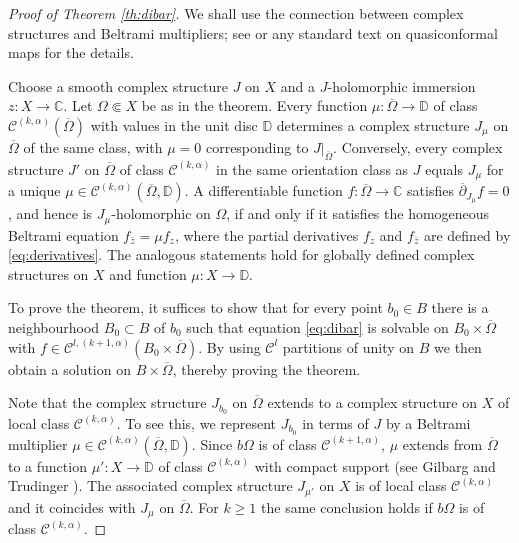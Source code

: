 \documentclass[11pt]{amsart}
\numberwithin{equation}{section}
\theoremstyle{definition}
\newcommand\Cscr{\mathscr{C}}
\newcommand\C{\mathbb{C}}
\newcommand\D{\overline{\mathbb D}}
\renewcommand\D{\mathbb D}
\newcommand\dibar{\overline\partial}
\begin{document}
\begin{proof}[Proof of Theorem \ref{th:dibar}]
We shall use the connection between complex
structures and Beltrami multipliers; see 
\cite[Sect.\ 2]{Forstneric2024Runge} or any 
standard text on quasiconformal maps for the details.

Choose a smooth complex structure $J$ on $X$ and 
a $J$-holomorphic immersion $z:X\to\C$.
Let $\Omega\Subset X$ be as in the theorem. 
Every function $\mu:\overline \Omega\to\D$ 
of class $\Cscr^{(k,\alpha)}(\overline \Omega)$  with values
in the unit disc $\D$ 
determines a complex structure $J_\mu$ on $\overline\Omega$ 
of the same class, with $\mu=0$ corresponding to $J|_{\overline\Omega}$. 
Conversely, every complex structure $J'$ on $\overline \Omega$
of class $\Cscr^{(k,\alpha)}$ in the same orientation class 
as $J$ equals $J_\mu$ for a unique 
$\mu\in \Cscr^{(k,\alpha)}(\overline \Omega,\D)$. 
A differentiable function $f:\overline\Omega\to\C$ satisfies 
$\dibar_{J_\mu}f=0$, and hence is $J_\mu$-holomorphic on
$\Omega$, if and only if it satisfies the homogeneous Beltrami equation 
$f_{\bar z} = \mu f_z$, where the partial derivatives $f_z$ and 
$f_{\bar z}$ are defined by \eqref{eq:derivatives}. The analogous
statements hold for globally defined complex structures on $X$
and function $\mu:X\to \D$.

To prove the theorem, it suffices to show that for every point $b_0\in B$ 
there is a neighbourhood $B_0\subset B$ of $b_0$ such that 
equation \eqref{eq:dibar} is solvable on $B_0\times \overline\Omega$ with 
$f\in \Cscr^{l,(k+1,\alpha)}(B_0\times \overline\Omega)$. 
By using $\Cscr^l$ partitions of unity on $B$ we then obtain 
a solution on $B\times \overline \Omega$, thereby proving the theorem.

Note that the complex structure $J_{b_0}$ on $\overline\Omega$
extends to a complex structure on $X$ of local class $\Cscr^{(k,\alpha)}$.
To see this, we represent 
$J_{b_0}$ in terms of $J$ by a Beltrami multiplier 
$\mu\in \Cscr^{(k,\alpha)}(\overline \Omega,\D)$. 
Since $b\Omega$ is of class $\Cscr^{(k+1,\alpha)}$,
$\mu$ extends from $\overline \Omega$ to a function
$\mu':X\to \D$ of class $\Cscr^{(k,\alpha)}$ 
with compact support 
(see Gilbarg and Trudinger \cite[Lemma 6.37]{GilbargTrudinger1983}). 
The associated complex structure $J_{\mu'}$ on $X$ is of local 
class $\Cscr^{(k,\alpha)}$ and it coincides with $J_\mu$ on 
$\overline \Omega$. For $k\ge 1$ the same conclusion 
holds if $b\Omega$ is of class $\Cscr^{(k,\alpha)}$.


\end{proof}
\end{document}
